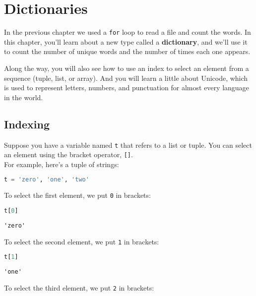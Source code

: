 \hypertarget{dictionaries}{%
\chapter{Dictionaries}\label{dictionaries}}

In the previous chapter we used a \passthrough{\lstinline!for!} loop to
read a file and count the words. In this chapter, you'll learn about a
new type called a \textbf{dictionary}, and we'll use it to count the
number of unique words and the number of times each one appears.

Along the way, you will also see how to use an index to select an
element from a sequence (tuple, list, or array). And you will learn a
little about Unicode, which is used to represent letters, numbers, and
punctuation for almost every language in the world.

\hypertarget{indexing}{%
\section{Indexing}\label{indexing}}

Suppose you have a variable named \passthrough{\lstinline!t!} that
refers to a list or tuple. You can select an element using the bracket
operator, \passthrough{\lstinline![]!}.\\
For example, here's a tuple of strings:

\begin{lstlisting}[language=Python]
t = 'zero', 'one', 'two'
\end{lstlisting}

To select the first element, we put \passthrough{\lstinline!0!} in
brackets:

\begin{lstlisting}[language=Python]
t[0]
\end{lstlisting}

\begin{lstlisting}[]
'zero'
\end{lstlisting}

To select the second element, we put \passthrough{\lstinline!1!} in
brackets:

\begin{lstlisting}[language=Python]
t[1]
\end{lstlisting}

\begin{lstlisting}[]
'one'
\end{lstlisting}

To select the third element, we put \passthrough{\lstinline!2!} in
brackets:

